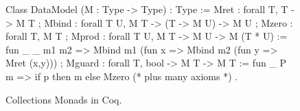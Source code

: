 \documentclass[preprint]{sigplanconf}
\begin{document}
\begin{figure}[t]
\label{fig:chaseable-functor}
\begin{coq}
Class DataModel (M : Type -> Type) : Type :=
{ Mret  : forall {T}, T -> M T
; Mbind : forall {T U}, M T -> (T -> M U) -> M U
; Mzero : forall {T}, M T
; Mprod : forall {T U}, M T -> M U -> M (T * U) :=
     fun _ _ m1 m2 => Mbind m1 (fun x => Mbind m2 (fun y => Mret (x,y)))
; Mguard : forall {T}, bool -> M T -> M T :=
     fun _ P m => if p then m else Mzero
 (* plus many axioms *)
}.
\end{coq}






\caption{Collections Monads in Coq.}
\label{fig:chaseable-functor}
\end{figure}
\end{document}
